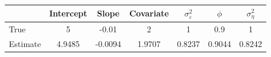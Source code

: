 \begin{tabular}{lcccccc}
\toprule
& Intercept & Slope & Covariate & $\sigma_\varepsilon^2$ & $\phi$ & $\sigma_\eta^2$ \\
\midrule
True & 5 & -0.01 & 2 & 1 & 0.9 & 1 \\
Estimate & 4.9485 & -0.0094 & 1.9707 & 0.8237 & 0.9044 & 0.8242 \\
\bottomrule
\end{tabular}
